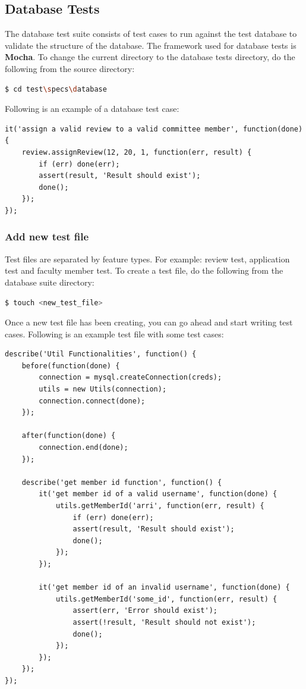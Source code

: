 \documentclass[fontsize=12pt,paper=letter,twoside]{scrartcl}
\begin{document}
\subsection{Database Tests}
The database test suite consists of test cases to run against the test database to validate the structure of the database. The framework used for database tests is \textbf{Mocha}. To change the current directory to the database tests directory, do the following from the source directory:\\

\begin{lstlisting}[language=bash]
  $ cd test\specs\database
\end{lstlisting}

\bigskip
\noindent Following is an example of a database test case:\\

\begin{lstlisting}
it('assign a valid review to a valid committee member', function(done) {
	review.assignReview(12, 20, 1, function(err, result) {
		if (err) done(err);
		assert(result, 'Result should exist');
		done();
	});
});
\end{lstlisting}

\newpage
\subsubsection{Add new test file}
Test files are separated by feature types. For example: review test, application test and faculty member test. To create a test file, do the following from the database suite directory:

\begin{lstlisting}[language=bash]
  $ touch <new_test_file>
\end{lstlisting}

\bigskip
\noindent Once a new test file has been creating, you can go ahead and start writing test cases. Following is an example test file with some test cases:\\

\begin{lstlisting}
describe('Util Functionalities', function() {
	before(function(done) {
		connection = mysql.createConnection(creds);
		utils = new Utils(connection);
		connection.connect(done);
	});
    
	after(function(done) {
		connection.end(done);
	});

	describe('get member id function', function() {
		it('get member id of a valid username', function(done) {
			utils.getMemberId('arri', function(err, result) {
				if (err) done(err);
				assert(result, 'Result should exist');
				done();
			});
		});

		it('get member id of an invalid username', function(done) {
			utils.getMemberId('some_id', function(err, result) {
				assert(err, 'Error should exist');
				assert(!result, 'Result should not exist');
				done();
			});
		});
	});
});
\end{lstlisting}
\end{document}
